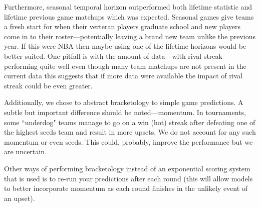 \documentclass{article} %
\begin{document}
Furthermore, seasonal temporal horizon outperformed both lifetime statistic and lifetime previous game matchups which was expected.
Seasonal games give teams a fresh start for when their verteran players graduate school and new players come in to their roster---potentially leaving a brand new team unlike the previous year.
If this were NBA then maybe using one of the lifetime horizons would be better suited.
One pitfall is with the amount of data---with rival streak performing quite well even though many team matchups are not present in the current data this suggests that if more data were available the impact of rival streak could be even greater.


Additionally, we chose to abstract bracketology to simple game predictions.
A subtle but important difference should be noted---momentum.
In tournaments, some ``underdog" teams manage to go on a win (hot) streak after defeating one of the highest seeds team and result in more upsets.
We do not account for any such momentum or even seeds.
This could, probably, improve the performance but we are uncertain.


Other ways of performing bracketology instead of an exponential scoring system that is used is to re-run your predictions after each round (this will allow models to better incorporate momentum as each round finishes in the unlikely event of an upset).




\small{
\nocite{*}


}
\end{document}
